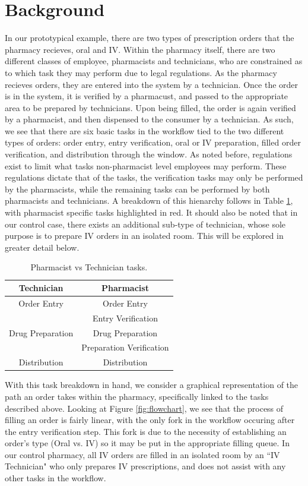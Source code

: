 \documentclass[10pt]{report}            %
\begin{document}
\section*{Background}
In our prototypical example, there are two types of prescription orders that the pharmacy recieves, oral and IV. Within the pharmacy itself, there are two different classes of employee, pharmacists and technicians, who are constrained as to which task they may perform due to legal regulations. As the pharmacy recieves orders, they are entered into the system by a technician. Once the order is in the system, it is verified by a pharmacust, and passed to the appropriate area to be prepared by technicians. Upon being filled, the order is again verified by a pharmacist, and then dispensed to the consumer by a technician. As such, we see that there are six basic tasks in the workflow tied to the two different types of orders: order entry, entry verification, oral or IV preparation, filled order verification, and distribution through the window. As noted before, regulations exist to limit what tasks non-pharmacist level employees may perform. These regulations dictate that of the tasks, the verification tasks may only be performed by the pharmacists, while the remaining tasks can be performed by both pharmacists and technicians. A breakdown of this hienarchy follows in Table \ref{table:tasks}, with pharmacist specific tasks highlighted in red. It should also be noted that in our control case, there exists an additional sub-type of technician, whose sole purpose is to prepare IV orders in an isolated room. This will be explored in greater detail below.
\begin{table}[H]
\centering
\begin{tabular}{|c||c|}
\hline
Technician & Pharmacist\\\hline\hline
Order Entry & Order Entry \\\hline
& \cellcolor{red!25}Entry Verification \\\hline
Drug Preparation & Drug Preparation\\\hline
& \cellcolor{red!25}Preparation Verification\\\hline
Distribution & Distribution\\\hline
\end{tabular}
\caption{Pharmacist vs Technician tasks.}
\label{table:tasks}
\end{table}
With this task breakdown in hand, we consider a graphical representation of the path an order takes within the pharmacy, specifically linked to the tasks described above. Looking at Figure \ref{fig:flowchart}, we see that the process of filling an order is fairly linear, with the only fork in the workflow occuring after the entry verification step. This fork is due to the necessity of establishing an order's type (Oral vs. IV) so it may be put in the appropriate filling queue. In our control pharmacy, all IV orders are filled in an isolated room by an ``IV Technician" who only prepares IV prescriptions, and does not assist with any other tasks in the workflow. 
\end{document}
